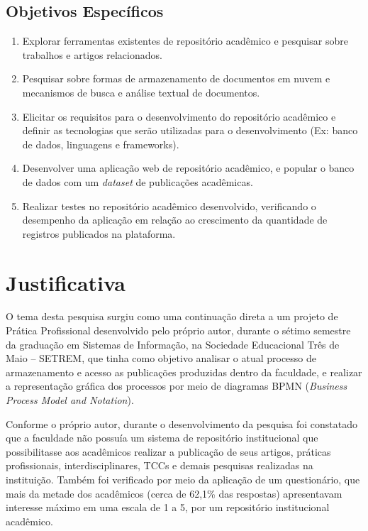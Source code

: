 \subsection{Objetivos Específicos}
\begin{enumerate}
    \item Explorar ferramentas existentes de repositório acadêmico e pesquisar sobre trabalhos e artigos relacionados.
    \item Pesquisar sobre formas de armazenamento de documentos em nuvem e mecanismos de busca e análise textual de documentos.
    \item Elicitar os requisitos para o desenvolvimento do repositório acadêmico e definir as tecnologias que serão utilizadas para o desenvolvimento (Ex: banco de dados, linguagens e frameworks).
    \item Desenvolver uma aplicação web de repositório acadêmico, e popular o banco de dados com um \emph{dataset} de publicações acadêmicas.
    \item Realizar testes no repositório acadêmico desenvolvido, verificando o desempenho da aplicação em relação ao crescimento da quantidade de registros publicados na plataforma.
\end{enumerate}

\section{Justificativa}\label{sec:justification}

O tema desta pesquisa surgiu como uma continuação direta a um projeto
de Prática Profissional desenvolvido pelo próprio autor, durante o sétimo
semestre da graduação em Sistemas de Informação, na Sociedade Educacional
Três de Maio – SETREM, que tinha como objetivo analisar o atual processo
de armazenamento e acesso as publicações produzidas dentro da faculdade,
e realizar a representação gráfica dos processos por meio de diagramas BPMN
(\emph{Business Process Model and Notation}).

Conforme o próprio autor, durante o desenvolvimento da pesquisa foi constatado que a faculdade
não possuía um sistema de repositório institucional que possibilitasse aos
acadêmicos realizar a publicação de seus artigos, práticas profissionais,
interdisciplinares, TCCs e demais pesquisas realizadas na instituição.
Também foi verificado por meio da aplicação de um questionário, que
mais da metade dos acadêmicos (cerca de 62,1\% das respostas) apresentavam
interesse máximo em uma escala de 1 a 5, por um repositório institucional acadêmico.

